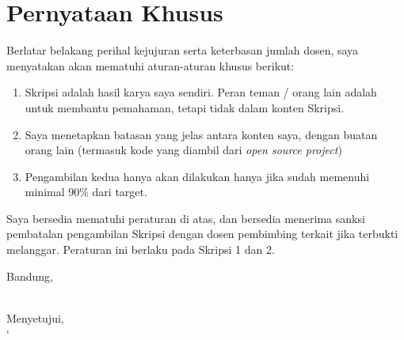 \documentclass[a4paper,twoside]{article}
\begin{document}
\section{Pernyataan Khusus}
Berlatar belakang perihal kejujuran serta keterbasan jumlah dosen, saya menyatakan akan mematuhi aturan-aturan khusus berikut:
\begin{enumerate}
	\item Skripsi adalah hasil karya saya sendiri. Peran teman / orang lain adalah untuk membantu pemahaman, tetapi tidak dalam konten Skripsi.
	\item Saya menetapkan batasan yang jelas antara konten saya, dengan buatan orang lain (termasuk kode yang diambil dari {\it open source project})
	\item Pengambilan kedua hanya akan dilakukan hanya jika sudah memenuhi minimal 90\% dari target.
\end{enumerate}
Saya bersedia mematuhi peraturan di atas, dan bersedia menerima sanksi pembatalan pengambilan Skripsi dengan dosen pembimbing terkait jika terbukti melanggar. Peraturan ini berlaku pada Skripsi 1 dan 2.

\vspace{1cm}
\centering Bandung, \tanggal\\
\vspace{2cm} \nama \\ 
\vspace{1cm}

Menyetujui, \\
`
\end{document}

